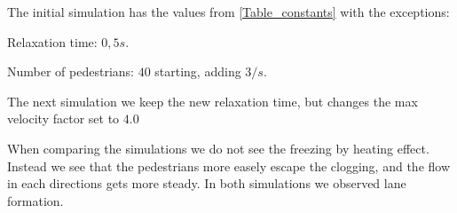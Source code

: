 The initial simulation has the values from \ref{Table_constants} with the exceptions:

\begin{itemize*}
    \item Relaxation time: $0,5 s$.
    \item Number of pedestrians: $40$ starting, adding $3/s$.
\end{itemize*}

The next simulation we keep the new relaxation time, but changes the max velocity factor set to $4.0$


When comparing the simulations we do not see the freezing by heating effect.
Instead we see that the pedestrians more easely escape the clogging, and the flow in each directions
gets more steady. In both simulations we observed lane formation.

